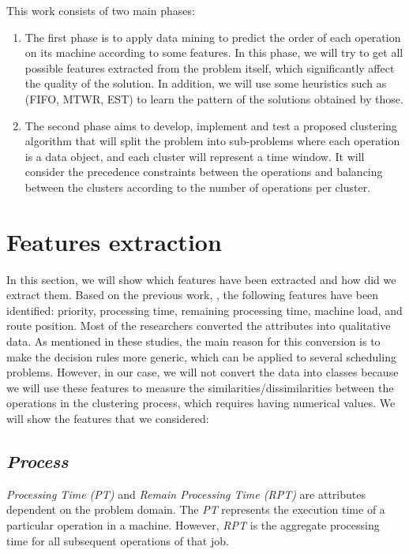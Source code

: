 \documentclass[runningheads]{llncs}
\begin{document}
This work consists of two main phases:

\begin{enumerate}
    \item The first phase is to apply data mining to predict the order of each operation on its machine according to some features. In this phase, we will try to get all possible features extracted from the problem itself, which significantly affect the quality of the solution. In addition, we will use some heuristics such as (FIFO, MTWR, EST) to learn the pattern of the solutions obtained by those.

    \item The second phase aims to develop, implement and test a proposed clustering algorithm that will split the problem into sub-problems where each operation is a data object, and each cluster will represent a time window. It will consider the precedence constraints between the operations and balancing between the clusters according to the number of operations per cluster.
\end{enumerate}


\section{Features extraction}
In this section, we will show which features have been extracted and how did we extract them. Based on the previous work, \cite{koonce2000using, harrath2002genetic, shahzad2010discovering, ismail2012production, adibi2014clustering, nasiri2019data}, the following features have been identified: priority, processing time, remaining processing time, machine load, and route position. Most of the researchers converted the attributes into qualitative data. As mentioned in these studies, the main reason for this conversion is to make the decision rules more generic, which can be applied to several scheduling problems. However, in our case, we will not convert the data into classes because we will use these features to measure the similarities/dissimilarities between the operations in the clustering process, which requires having numerical values.
We will show the features that we considered:
\subsection{\textit{Process}}
\textit{Processing Time (PT)}  and \textit{Remain Processing Time (RPT)} are attributes dependent on the problem domain. The \textit{PT} represents the execution time of a particular operation in a machine. However, \textit{RPT} is the aggregate processing time for all subsequent operations of that job.
\end{document}
